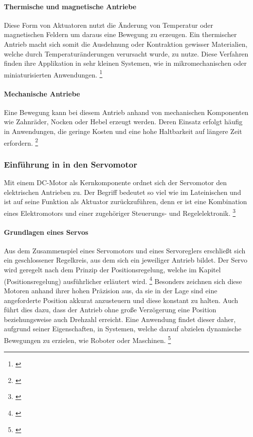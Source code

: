 \documentclass[titlepage,12pt,twoside]{article}
\begin{document}
\paragraph{Thermische und magnetische Antriebe}
\hfill \break
\hfill \break
Diese Form von Aktuatoren nutzt die Änderung von Temperatur oder 
magnetischen Feldern um daraus eine Bewegung zu erzeugen. Ein thermischer 
Antrieb macht sich somit die Ausdehnung oder Kontraktion gewisser 
Materialien, welche durch Temperaturänderungen verursacht wurde, zu 
nutze. Diese Verfahren finden ihre Applikation in sehr kleinen Systemen, 
wie in mikromechanischen oder miniaturisierten Anwendungen. \footnote{\cite{Q1}} \\
\paragraph{Mechanische Antriebe}
\hfill \break
\hfill \break
Eine Bewegung kann bei diesem Antrieb anhand von mechanischen Komponenten 
wie Zahnräder, Nocken oder Hebel erzeugt werden. Deren Einsatz erfolgt 
häufig in Anwendungen, die geringe Kosten und eine hohe Haltbarkeit auf 
längere Zeit erfordern. \footnote{\cite{Q1}} \\
\subsubsection{Einführung in in den Servomotor}
Mit einem DC-Motor als Kernkomponente ordnet sich der Servomotor den 
elektrischen Antrieben zu. Der Begriff  bedeutet so viel wie 
 im Lateinischen und ist auf seine Funktion als 
Aktuator zurückzuführen, denn er ist eine Kombination eines 
Elektromotors und einer zugehöriger Steuerungs- und Regelelektronik. \footnote{\cite{Q6}} \\
\paragraph{Grundlagen eines Servos}
\hfill \break
\hfill \break
Aus dem Zusammenspiel eines Servomotors und eines Servoreglers 
erschließt sich ein geschlossener Regelkreis, aus dem sich ein 
jeweiliger Antrieb bildet. Der Servo wird geregelt nach dem Prinzip der 
Positionsregelung, welche im Kapitel (Positionsregelung) ausführlicher 
erläutert wird. \footnote{\cite{Q6}} Besonders zeichnen sich diese Motoren anhand ihrer 
hohen Präzision aus, da sie in der Lage sind eine angeforderte Position 
akkurat anzusteuern und diese konstant zu halten. Auch führt dies dazu, 
dass der Antrieb ohne große Verzögerung eine Position beziehungsweise 
auch Drehzahl erreicht. Eine Anwendung findet dieser daher, aufgrund 
seiner Eigenschaften, in Systemen, welche darauf abzielen dynamische 
Bewegungen zu erzielen, wie Roboter oder Maschinen. \footnote{\cite{Q7}} \\
\end{document}
